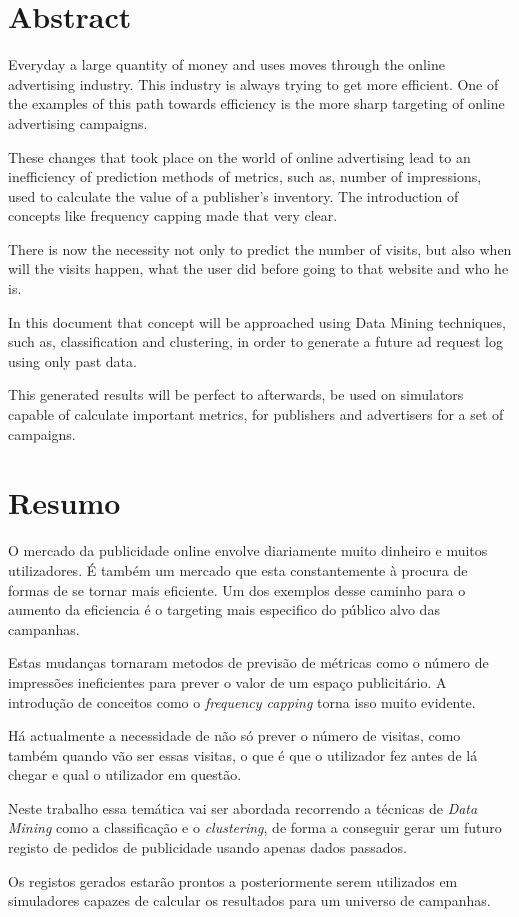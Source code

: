 \chapter*{Abstract}

Everyday a large quantity of money and uses moves through the online advertising
industry.
This industry is always trying to get more efficient. One of the examples of
this path towards efficiency is the more sharp targeting of online advertising
campaigns. 

These changes that took place on the world of online advertising lead
to an inefficiency of prediction methods of metrics, such as, number of
impressions, used to calculate the value
of a publisher's inventory. The introduction of concepts like frequency capping made that very clear.

There is now the necessity not only to predict the number of visits, but also when will the visits happen, what the user did before going to that
website and who he is.

In this document that concept will be approached using Data Mining techniques, such as, classification and clustering, in order to generate a future ad request log
using only past data.

This generated results will be perfect to afterwards, be used on simulators
capable of calculate important metrics, for publishers and advertisers for a set
of campaigns.

\chapter*{Resumo}

O mercado da publicidade online envolve diariamente muito dinheiro e muitos utilizadores. 
É também um mercado que esta constantemente à procura de formas de se tornar
mais eficiente.
Um dos exemplos desse caminho para o aumento da eficiencia é o targeting mais
especifico do público alvo das campanhas. 

Estas mudanças tornaram metodos de
previsão de métricas como o número de impressões ineficientes para prever o valor de um
espaço publicitário. A introdução de conceitos como o \textit{frequency capping} torna isso muito evidente.

Há actualmente a necessidade de não só prever o número de visitas, como também quando vão ser essas visitas, o que é que o utilizador fez antes de lá chegar e qual
o utilizador em questão. 

Neste trabalho essa temática vai ser abordada recorrendo a técnicas de \textit{Data Mining} como a classificação e o \textit{clustering}, de forma a conseguir gerar
um futuro registo de pedidos de publicidade usando apenas dados passados.

Os registos gerados estarão prontos a posteriormente serem utilizados em
simuladores capazes de calcular os resultados para um universo de campanhas.
